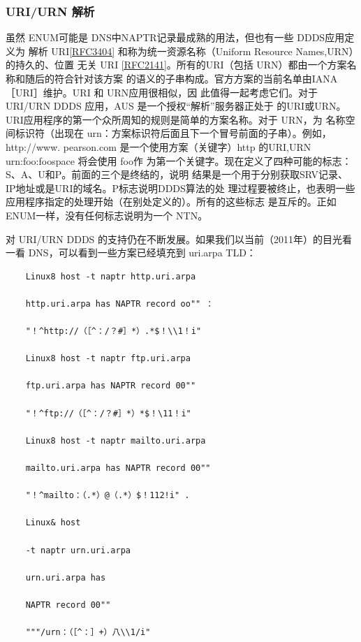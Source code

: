 \subsubsection{ URI/URN 解析}

虽然 ENUM可能是 DNS中NAPTR记录最成熟的用法，但也有一些 DDDS应用定义为
解析 URI\href{https://www.rfc-editor.org/rfc/rfc3404}{[RFC3404]} 和称为统一资源名称（Uniform Resource Names,URN）的持久的、位置
无关 URI \href{https://www.rfc-editor.org/rfc/rfc2141}{[RFC2141]}。所有的URI（包括 URN）都由一个方案名称和随后的符合针对该方案
的语义的子串构成。官方方案的当前名单由IANA［URI］维护。URI 和 URN应用很相似，因
此值得一起考虑它们。对于 URI/URN DDDS 应用，AUS 是一个授权“解析”服务器正处于
的URI或URN。URI应用程序的第一个众所周知的规则是简单的方案名称。对于 URN，为
名称空间标识符（出现在 urn：方案标识符后面且下一个冒号前面的子串）。例如，http://www.
pearson.com 是一个使用方案（关键字）http 的URI,URN urn:foo:foospace 将会使用 foo作
为第一个关键字。现在定义了四种可能的标志：S、A、U和P。前面的三个是终结的，说明
结果是一个用于分别获取SRV记录、IP地址或是URI的域名。P标志说明DDDS算法的处
理过程要被终止，也表明一些应用程序指定的处理开始（在别处定义的）。所有的这些标志
是互斥的。正如 ENUM一样，没有任何标志说明为一个 NTN。

对 URI/URN DDDS 的支持仍在不断发展。如果我们以当前（2011年）的目光看一看
DNS，可以看到一些方案已经填充到 uri.arpa TLD：

\begin{verbatim}
    Linux8 host -t naptr http.uri.arpa
    
    http.uri.arpa has NAPTR record oo"" ：
    
    "！^http://（［^：/？#］*）.*$！\\1！i"
    
    Linux8 host -t naptr ftp.uri.arpa
    
    ftp.uri.arpa has NAPTR record 00""
    
    "！^ftp://（［^：/？#］*）*$！\11！i"
    
    Linux8 host -t naptr mailto.uri.arpa
    
    mailto.uri.arpa has NAPTR record 00""
    
    "！^mailto：（.*）@（.*）$！112!i" .
    
    Linux& host
    
    -t naptr urn.uri.arpa
    
    urn.uri.arpa has
    
    NAPTR record 00""
    
    """/urn：（［^：］+）八\\1/i"
\end{verbatim}

